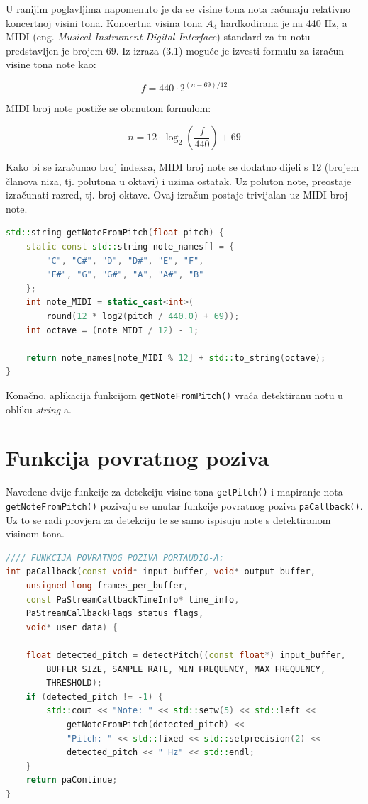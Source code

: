 \documentclass[times, utf8, diplomski, numeric]{fer}
\begin{document}
U ranijim poglavljima napomenuto je da se visine tona nota računaju relativno koncertnoj visini tona. Koncertna visina tona $A_4$ hardkodirana je na 440 Hz, a MIDI (eng. \textit{Musical Instrument Digital Interface}) standard za tu notu predstavljen je brojem 69.\cite{inspiredacousticsMIDINote} Iz izraza (3.1) moguće je izvesti formulu za izračun visine tona note kao:

\begin{equation}
	f = 440 \cdot 2^{(n-69)/12}
\end{equation}

MIDI broj note postiže se obrnutom formulom:

\begin{equation}
	n = 12 \cdot \log_2(\frac{f}{440}) + 69
\end{equation}

Kako bi se izračunao broj indeksa, MIDI broj note se dodatno dijeli s 12 (brojem članova niza, tj. polutona u oktavi) i uzima ostatak. Uz poluton note, preostaje izračunati razred, tj. broj oktave. Ovaj izračun postaje trivijalan uz MIDI broj note.

\begin{lstlisting}[language=C++, frame=single]
std::string getNoteFromPitch(float pitch) {
	static const std::string note_names[] = {
		"C", "C#", "D", "D#", "E", "F",
		"F#", "G", "G#", "A", "A#", "B"
	};
	int note_MIDI = static_cast<int>(
		round(12 * log2(pitch / 440.0) + 69));
	int octave = (note_MIDI / 12) - 1;
	
	return note_names[note_MIDI % 12] + std::to_string(octave);
}
\end{lstlisting}

Konačno, aplikacija funkcijom \verb*|getNoteFromPitch()| vraća detektiranu notu u obliku \textit{string}-a.

\section{Funkcija povratnog poziva}
%
Navedene dvije funkcije za detekciju visine tona \verb*|getPitch()| i mapiranje nota \verb*|getNoteFromPitch()| pozivaju se unutar funkcije povratnog poziva \verb*|paCallback()|. Uz to se radi provjera za detekciju te se samo ispisuju note s detektiranom visinom tona.

\begin{lstlisting}[language=C++, frame=single]
//// FUNKCIJA POVRATNOG POZIVA PORTAUDIO-A:
int paCallback(const void* input_buffer, void* output_buffer,
	unsigned long frames_per_buffer,
	const PaStreamCallbackTimeInfo* time_info,
	PaStreamCallbackFlags status_flags,
	void* user_data) {
	
	float detected_pitch = detectPitch((const float*) input_buffer,
		BUFFER_SIZE, SAMPLE_RATE, MIN_FREQUENCY, MAX_FREQUENCY,
		THRESHOLD);
	if (detected_pitch != -1) {
		std::cout << "Note: " << std::setw(5) << std::left <<
			getNoteFromPitch(detected_pitch) <<
			"Pitch: " << std::fixed << std::setprecision(2) <<
			detected_pitch << " Hz" << std::endl;
	}
	return paContinue;
}
\end{lstlisting}
\end{document}
